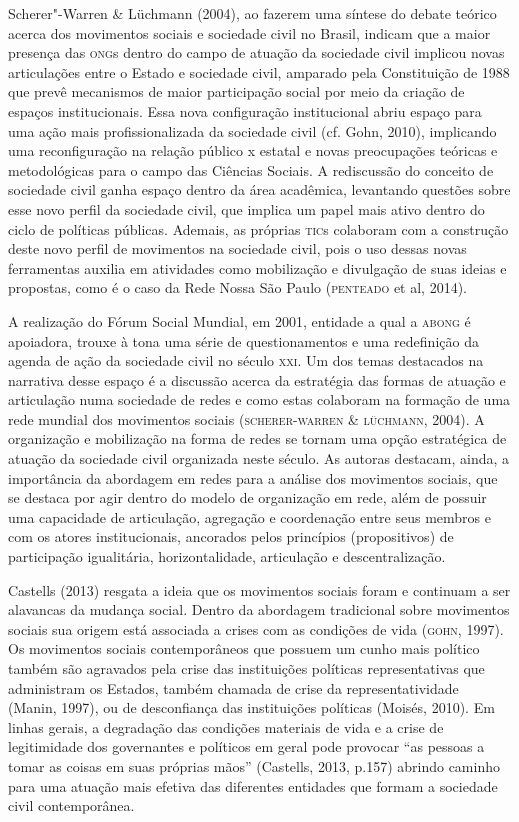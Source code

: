 Scherer"-Warren \& Lüchmann (2004), ao fazerem uma síntese do debate
teórico acerca dos movimentos sociais e sociedade civil no Brasil,
indicam que a maior presença das \textsc{ong}s dentro do campo de atuação da
sociedade civil implicou novas articulações entre o Estado e sociedade
civil, amparado pela Constituição de 1988 que prevê mecanismos de maior
participação social por meio da criação de espaços institucionais. Essa
nova configuração institucional abriu espaço para uma ação mais
profissionalizada da sociedade civil (cf. Gohn, 2010), implicando uma
reconfiguração na relação público x estatal e novas preocupações
teóricas e metodológicas para o campo das Ciências Sociais. A
rediscussão do conceito de sociedade civil ganha espaço dentro da área
acadêmica, levantando questões sobre esse novo perfil da sociedade
civil, que implica um papel mais ativo dentro do ciclo de políticas
públicas. Ademais, as próprias \textsc{tic}s colaboram com a construção deste
novo perfil de movimentos na sociedade civil, pois o uso dessas novas
ferramentas auxilia em atividades como mobilização e divulgação de suas
ideias e propostas, como é o caso da Rede Nossa São Paulo (\textsc{penteado} et
al, 2014).

A realização do Fórum Social Mundial, em 2001, entidade a qual a \textsc{abong} é
apoiadora, trouxe à tona uma série de questionamentos e uma redefinição
da agenda de ação da sociedade civil no século \textsc{xxi}. Um dos temas
destacados na narrativa desse espaço é a discussão acerca da estratégia
das formas de atuação e articulação numa sociedade de redes e como estas
colaboram na formação de uma rede mundial dos movimentos sociais
(\textsc{scherer}-\textsc{warren} \& \textsc{lüchmann}, 2004). A organização e mobilização na forma
de redes se tornam uma opção estratégica de atuação da sociedade civil
organizada neste século. As autoras destacam, ainda, a importância da
abordagem em redes para a análise dos movimentos sociais, que se destaca
por agir dentro do modelo de organização em rede, além de possuir uma
capacidade de articulação, agregação e coordenação entre seus membros e
com os atores institucionais, ancorados pelos princípios (propositivos)
de participação igualitária, horizontalidade, articulação e
descentralização.

Castells (2013) resgata a ideia que os movimentos sociais foram e
continuam a ser alavancas da mudança social. Dentro da abordagem
tradicional sobre movimentos sociais sua origem está associada a crises
com as condições de vida (\textsc{gohn}, 1997). Os movimentos sociais
contemporâneos que possuem um cunho mais político também são agravados
pela crise das instituições políticas representativas que administram os
Estados, também chamada de crise da representatividade (Manin, 1997), ou
de desconfiança das instituições políticas (Moisés, 2010). Em linhas
gerais, a degradação das condições materiais de vida e a crise de
legitimidade dos governantes e políticos em geral pode provocar ``as
pessoas a tomar as coisas em suas próprias mãos'' (Castells, 2013, p.157)
abrindo caminho para uma atuação mais efetiva das diferentes entidades
que formam a sociedade civil contemporânea.

